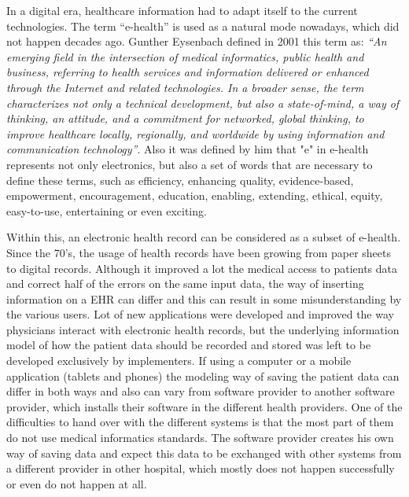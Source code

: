 \documentclass[mim_thesis.tex]{subfiles}
\begin{document}
In a digital era, healthcare information had to adapt itself to the current technologies. The term “e-health” is used as a natural mode nowadays, which did not happen decades ago. \citep{Eysenbach2001} Gunther Eysenbach defined in 2001 this term as: \textit{“An emerging field in the intersection of medical informatics, public health and business, referring to health services and information delivered or enhanced through the Internet and related technologies. In a broader sense, the term characterizes not only a technical development, but also a state-of-mind, a way of thinking, an attitude, and a commitment for networked, global thinking, to improve healthcare locally, regionally, and worldwide by using information and communication technology”}. Also it was defined by him that "e" in e-health represents not only electronics, but also a set of words that are necessary to define these terms, such as efficiency, enhancing quality, evidence-based, empowerment, encouragement, education, enabling, extending, ethical, equity, easy-to-use, entertaining or even exciting.

Within this, an electronic health record can be considered as a subset of e-health. Since the 70’s, the usage of health records have been growing from paper sheets to digital records. Although it improved a lot the medical access to patients data and correct half of the errors on the same input data, the way of inserting information on a EHR can differ and this can result in some misunderstanding by the various users. Lot of new applications were developed and improved the way physicians interact with electronic health records, but the underlying information model of how the patient data should be recorded and stored was left to be developed exclusively by implementers. If using a computer or a mobile application (tablets and phones) the modeling way of saving the patient data can differ in both ways and also can vary from software provider to another software provider, which installs their software in the different health providers. One of the difficulties to hand over with the different systems is that the most part of them do not use medical informatics standards. The software provider creates his own way of saving data and expect this data to be exchanged with other systems from a different provider in other hospital, which mostly does not happen successfully or even do not happen at all. 
\end{document}
